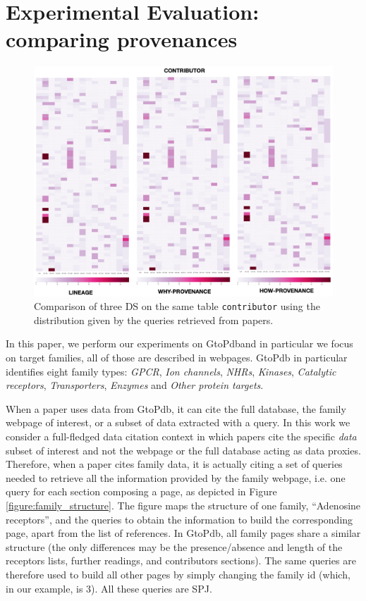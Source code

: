 \section{Experimental Evaluation: comparing provenances}
\label{sec:experiments}

\begin{figure}[t]
  \includegraphics[width=1\textwidth]{figures/paper_based_comparison}
  \caption{Comparison of three DS on the same table \texttt{contributor} using the distribution given by the queries retrieved from papers.}
  \label{figure:comparison_on_papers}
\end{figure}

In this paper, we perform our experiments on GtoPdband in particular we focus on target families, all of those are described in webpages. 
GtoPdb in particular identifies eight family types: \emph{GPCR}, \emph{Ion channels}, \emph{NHRs}, \emph{Kinases}, \emph{Catalytic receptors}, \emph{Transporters}, \emph{Enzymes} and \emph{Other protein targets}.  

When a paper uses data from GtoPdb, it can cite the full database, the family webpage of interest, or a subset of data extracted with a query. 
In this work we consider a full-fledged data citation context in which papers cite the specific \emph{data} subset of interest and not the webpage or the full database acting as data proxies.  
Therefore, when a paper cites family data, it is actually citing a set of queries needed to retrieve all the information provided by the family webpage, i.e. one query for each section composing a page, as depicted in Figure \ref{figure:family_structure}. 
The figure maps the structure of one family, ``Adenosine receptors'', and the queries to obtain the information to build the corresponding page, apart from the list of references. 
In GtoPdb, all family pages share a similar structure (the only differences may be the presence/absence and length of the receptors lists, further readings, and contributors sections).
The same queries are therefore used to build all other pages by simply changing the family id (which, in our example, is 3). All these queries are SPJ. 

